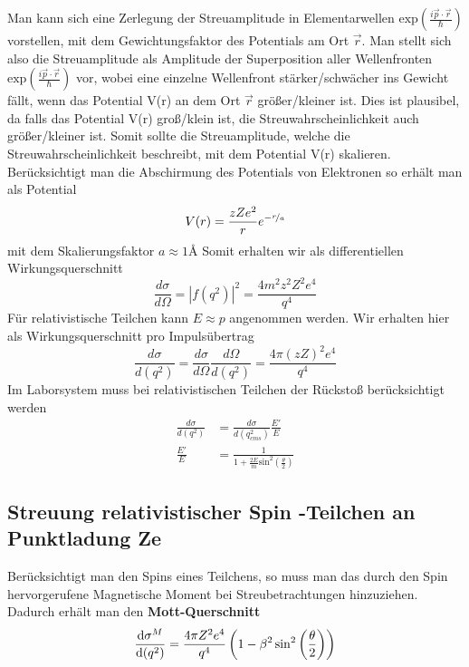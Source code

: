 \documentclass[Ex4_Zusammenfassung.tex]{subfiles}
\begin{document}
 Man kann sich eine Zerlegung der Streuamplitude in Elementarwellen $\text{exp} \left(\frac{i \vec p \cdot \vec r}{\hslash}\right)$  vorstellen, mit dem Gewichtungsfaktor des Potentials am Ort $\vec r$. Man stellt sich also die Streuamplitude als Amplitude der Superposition aller Wellenfronten  $\text{exp} \left(\frac{i \vec p \cdot \vec r}{\hslash}\right)$ vor, wobei eine einzelne Wellenfront stärker/schwächer ins Gewicht fällt, wenn das Potential V(r) an dem Ort $\vec r$ größer/kleiner ist. Dies ist plausibel, da falls das Potential V(r) groß/klein ist, die Streuwahrscheinlichkeit auch größer/kleiner ist. Somit sollte die Streuamplitude, welche die Streuwahrscheinlichkeit beschreibt, mit dem Potential V(r) skalieren. \newline
 Berücksichtigt man die Abschirmung des Potentials von Elektronen so erhält man als Potential
 \begin{equation}
 V(r)=\frac{zZe^2}{r} e^{-\nicefrac{r}{a}} 
 \end{equation}
 mit dem Skalierungsfaktor $a\approx 1  \text{\AA}$ \newline
 Somit erhalten wir als differentiellen Wirkungsquerschnitt 
\begin{equation}
\frac{d\sigma}{d\Omega} = |f(q^2)|^2 = \frac{4m^2z^2Z^2e^4}{q^4}
\end{equation}
Für relativistische Teilchen kann $E\approx p $ angenommen werden. Wir erhalten hier als Wirkungsquerschnitt pro Impulsübertrag
\begin{equation}
\frac{d\sigma}{d(q^2)} = \frac{d\sigma}{d\Omega} \frac{d\Omega}{d(q^2)} = \frac{4 \pi(zZ)^2e^4}{q^4}
\end{equation}
Im Laborsystem muss bei relativistischen Teilchen der Rückstoß berücksichtigt werden
\begin{align}
\frac{d\sigma}{d(q^2)} &= \frac{d\sigma}{d(q^2_{cms})} \frac{E'}{E} \\
\frac{E'}{E} &= \frac{1}{1+\frac{2E}{m} \text{sin}^2(\frac{\theta}{2})}
\end{align}

\subsection{Streuung relativistischer Spin -Teilchen an Punktladung Ze}
Berücksichtigt man den Spins eines Teilchens, so muss man das durch den Spin hervorgerufene Magnetische Moment bei Streubetrachtungen hinzuziehen. Dadurch erhält man den \textbf{Mott-Querschnitt}
\begin{equation}
\frac{\mathrm{d} \sigma^M}{\mathrm{d} (q^2)} = \frac{4 \pi Z^2 e^4}{q^4}\left(1-\beta^2 \sin^2 \left(\frac{\theta}{2}\right)\right)
\end{equation} \newpage
\end{document}
